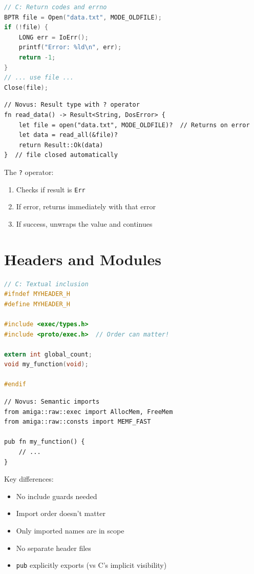\begin{lstlisting}[language=C]
// C: Return codes and errno
BPTR file = Open("data.txt", MODE_OLDFILE);
if (!file) {
    LONG err = IoErr();
    printf("Error: %ld\n", err);
    return -1;
}
// ... use file ...
Close(file);
\end{lstlisting}

\begin{lstlisting}
// Novus: Result type with ? operator
fn read_data() -> Result<String, DosError> {
    let file = open("data.txt", MODE_OLDFILE)?  // Returns on error
    let data = read_all(&file)?
    return Result::Ok(data)
}  // file closed automatically
\end{lstlisting}

The \texttt{?} operator:
\begin{enumerate}
    \item Checks if result is \texttt{Err}
    \item If error, returns immediately with that error
    \item If success, unwraps the value and continues
\end{enumerate}

\section{Headers and Modules}

\begin{lstlisting}[language=C]
// C: Textual inclusion
#ifndef MYHEADER_H
#define MYHEADER_H

#include <exec/types.h>
#include <proto/exec.h>  // Order can matter!

extern int global_count;
void my_function(void);

#endif
\end{lstlisting}

\begin{lstlisting}
// Novus: Semantic imports
from amiga::raw::exec import AllocMem, FreeMem
from amiga::raw::consts import MEMF_FAST

pub fn my_function() {
    // ...
}
\end{lstlisting}

Key differences:
\begin{itemize}
    \item No include guards needed
    \item Import order doesn't matter
    \item Only imported names are in scope
    \item No separate header files
    \item \texttt{pub} explicitly exports (vs C's implicit visibility)
\end{itemize}

